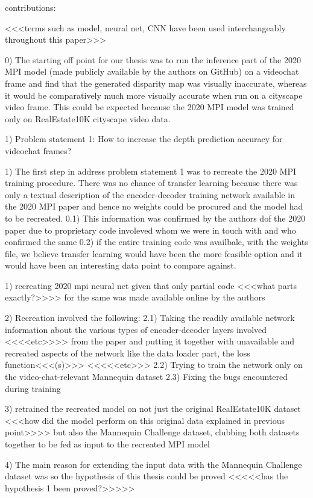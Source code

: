 contributions:

<<<terms such as model, neural net, CNN have been used interchangeably throughout this paper>>>

0) The starting off point for our thesis was to run the inference part of the 2020 MPI model (made publicly available by the authors on GitHub) on a videochat frame and find that the generated disparity map was visually inaccurate, whereas it would be comparatively much more visually accurate when run on a cityscape video frame. This could be expected because the 2020 MPI model was trained only on RealEstate10K cityscape video data.   

1) Problem statement 1: How to increase the depth prediction accuracy for videochat frames? 

1) The first step in address problem statement 1 was to recreate the 2020 MPI training procedure. There was no chance of transfer learning because there was only a textual description of the encoder-decoder training network available in the 2020 MPI paper and hence no weights could be procured and the model had to be recreated. 
    0.1) This information was confirmed by the authors dof the 2020 paper due to proprietary code involeved whom we were in touch with and who confirmed the same
    0.2) if the entire training code was availbale, with the weights file, we believe transfer learning would have been the more feasible option and it would have been an interesting data point to compare against. 
    
1) recreating 2020 mpi neural net given that only partial code <<<what parts exactly?>>>> for the same was made available online by the authors 

2) Recreation involved the following:
    2.1) Taking the readily available network information about the various types of encoder-decoder layers involved <<<<etc>>>> from the paper and putting it together with unavailable and recreated aspects of the network like the data loader part, the loss function<<<(s)>>> <<<<<etc>>>
    2.2) Trying to train the network only on the video-chat-relevant Mannequin dataset
    2.3) Fixing the bugs encountered during training
    

3) retrained the recreated model on not just the original RealEstate10K dataset <<<how did the model perform on this original data explained in previous point>>>> but also the Mannequin Challenge dataset, clubbing both datasets together to be fed as input to the recreated MPI model

4) The main reason for extending the input data with the Mannequin Challenge dataset was so the hypothesis of this thesis could be proved <<<<<has the hypothesis 1 been proved?>>>>>

